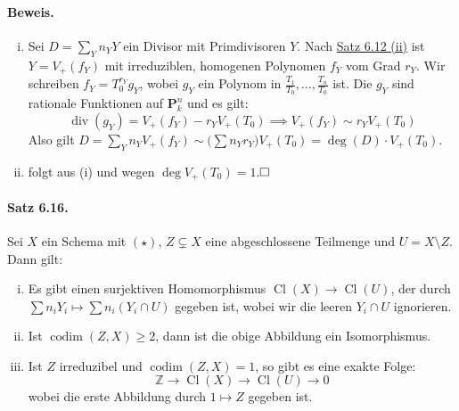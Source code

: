 \documentclass[11pt,b5paper,openany]{memoir}
\def \qed {$\hfill\square$}
\begin{document}
\paragraph{Beweis.} \begin{enumerate}[(i)]
\item Sei $D=\sum_Y n_YY$ ein Divisor mit Primdivisoren $Y$. Nach \hyperref[6.12]{Satz 6.12 (ii)} ist $Y=V_+(f_Y)$ mit irreduziblen, homogenen Polynomen $f_Y$ vom Grad $r_Y$. Wir schreiben $f_Y=T_0^{r_Y} g_Y$, wobei $g_Y$ ein Polynom in $\frac{T_1}{T_0},\ldots,\frac{T_n}{T_0}$ ist. Die $g_Y$ sind rationale Funktionen auf $\mathbf{P}_k^n$ und es gilt:
\[\operatorname{div}(g_Y) = V_+(f_Y)-r_YV_+(T_0) \implies V_+(f_Y)\sim r_YV_+(T_0) \]
Also gilt $D=\sum_Yn_Y V_+(f_Y)\sim \big(\sum n_Y r_Y\big) V_+(T_0) = \deg(D)\cdot V_+(T_0)$.
\item folgt aus (i) und wegen $\deg V_+(T_0)=1$.\qed
\end{enumerate}

\paragraph{Satz 6.16.}\label{6.16} Sei $X$ ein Schema mit $(\star)$, $Z\subsetneq X$ eine abgeschlossene Teilmenge und $U=X\setminus Z$. Dann gilt:
\begin{enumerate}[(i)]
\item Es gibt einen surjektiven Homomorphismus $\operatorname{Cl}(X)\to\operatorname{Cl}(U)$, der durch $\sum n_iY_i\mapsto \sum n_i(Y_i\cap U)$ gegeben ist, wobei wir die leeren $Y_i\cap U$ ignorieren.
\item Ist $\operatorname{codim}(Z,X)\geq 2$, dann ist die obige Abbildung ein Isomorphismus.
\item Ist $Z$ irreduzibel und $\operatorname{codim}(Z,X)=1$, so gibt es eine exakte Folge:
\[\mathbb{Z}\to\operatorname{Cl}(X)\to\operatorname{Cl}(U)\to 0 \]
wobei die erste Abbildung durch $1\mapsto Z$ gegeben ist.
\end{enumerate}
\end{document}

